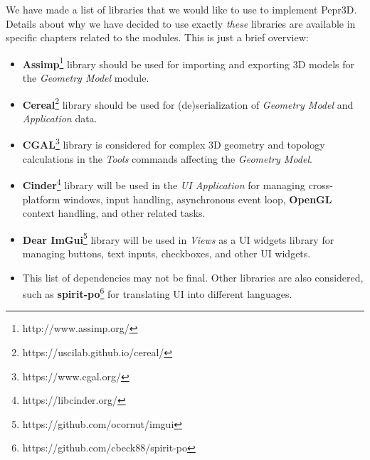 We have made a list of libraries that we would like to use to implement Pepr3D.
Details about why we have decided to use exactly \emph{these} libraries are available in specific chapters related to the modules.
This is just a brief overview:
%
\begin{itemize}
\item \textbf{Assimp}\footnote{http://www.assimp.org/} library should be used for importing and exporting 3D models for the \emph{Geometry Model} module.
\item \textbf{Cereal}\footnote{https://uscilab.github.io/cereal/} library should be used for (de)serialization of \emph{Geometry Model} and \emph{Application} data.
\item \textbf{CGAL}\footnote{https://www.cgal.org/} library is considered for complex 3D geometry and topology calculations in the \emph{Tools} commands affecting the \emph{Geometry Model}.
\item \textbf{Cinder}\footnote{https://libcinder.org/} library will be used in the \emph{UI Application} for managing cross-platform windows, input handling, asynchronous event loop, \textbf{OpenGL} context handling, and other related tasks.
\item \textbf{Dear ImGui}\footnote{https://github.com/ocornut/imgui} library will be used in \emph{Views} as a UI widgets library for managing buttons, text inputs, checkboxes, and other UI widgets.
\item This list of dependencies may not be final.
      Other libraries are also considered, such as \textbf{spirit-po}\footnote{https://github.com/cbeck88/spirit-po} for translating UI into different languages.
\end{itemize}
